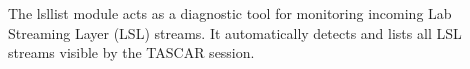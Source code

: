 The lsllist module acts as a diagnostic tool for monitoring incoming
Lab Streaming Layer (LSL) streams. It automatically detects and lists
all LSL streams visible by the TASCAR session.
